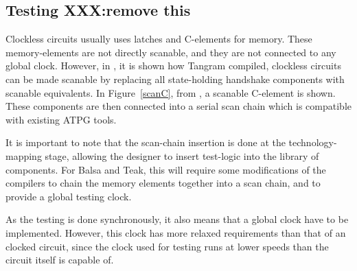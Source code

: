 \subsection{Testing XXX:remove this}


Clockless circuits usually uses latches and C-elements for
memory. These memory-elements are not directly scanable, and they are
not connected to any global clock. However, in \cite{fullscan}, it is
shown how Tangram compiled, clockless circuits can be made scanable by
replacing all state-holding handshake components with scanable
equivalents. In Figure~\ref{scanC}, from \cite{fullscan}, a scanable
C-element is shown. These components are then connected into a serial
scan chain which is compatible with existing ATPG tools.

It is important to note that the scan-chain insertion is done at the
technology-mapping stage, allowing the designer to insert test-logic
into the library of components. For Balsa and Teak, this will require
some modifications of the compilers to chain the memory elements
together into a scan chain, and to provide a global testing clock.

As the testing is done synchronously, it also means that a global
clock have to be implemented. However, this clock has more relaxed
requirements than that of an clocked circuit, since the clock used for
testing runs at lower speeds than the circuit itself is capable of.





